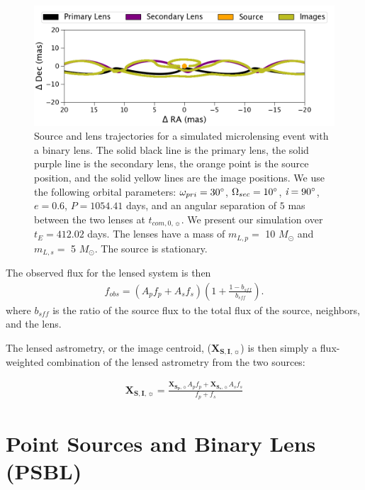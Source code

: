 \documentclass[twocolumn]{aastex701}
\newcommand{\vect}[1]{\boldsymbol{#1}}
\newcommand{\bsff}{b_{sff}}
\newcommand{\Xspvec}{\vect{X}_{\boldsymbol{S_p},\sun}}
\newcommand{\XIvec}{\vect{X}_{\boldsymbol{S, I},\sun}}
\newcommand{\Xssvec}{\vect{X}_{\boldsymbol{S_s},\sun}}
\newcommand{\tcomnot}{t_{com,0,\sun}}
\newcommand{\w}{\omega_{pri}}
\newcommand{\bigomega}{\Omega_{sec}}
\newcommand{\inclination}{\textit{i}}
\newcommand{\period}{\textit{P}}
\begin{document}
\begin{figure}
    \centering
    \includegraphics[width= \textwidth] {figures/psbl_keplerian.png}
    \caption{Source and lens trajectories for a simulated microlensing event with a binary lens. The solid black line is the primary lens, the solid purple line is the secondary lens, the orange point is the source position, and the solid yellow lines are the image positions. We use the following orbital parameters: $\w = 30 \degree$, $\bigomega = 10 \degree$, $\inclination = 90 \degree$, $e=0.6$, $\period = 1054.41 $ days, and an angular separation of $5$ mas between the two lenses at $\tcomnot$. We present our simulation over $t_E=412.02$ days. The lenses have a mass of $m_{L,p}=$ 10 $M_\odot$ and $m_{L,s}=$ 5 $M_\odot$. The source is stationary.}
    \label{fig:psbl_keplerian}
\end{figure}

The observed flux for the lensed system is then
\begin{eqnarray}
f_{obs} = (A_p f_p + A_s f_s) \left(1 + \frac{1 - \bsff}{\bsff} \right).
\end{eqnarray}
where $\bsff$ is the ratio of the source flux to the total flux of the source, neighbors, and the lens.  

The lensed astrometry, or the image centroid, ($\XIvec$) is then simply a flux-weighted combination of the lensed astrometry from the two sources:

\begin{eqnarray}
    \XIvec = \frac{\Xspvec A_p f_p + \Xssvec A_s f_s}{f_p+f_s}
\end{eqnarray}


\section{Point Sources and Binary Lens (PSBL) 
\label{sec:binlenses}}
\end{document}
